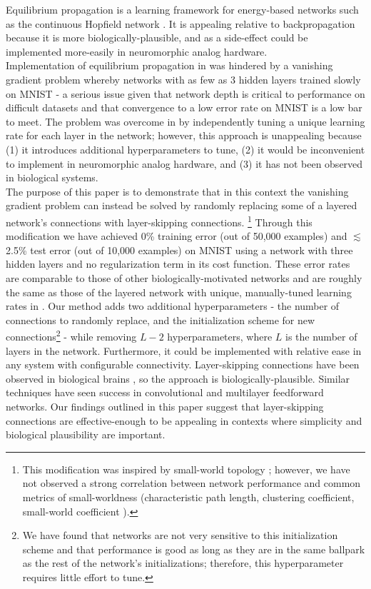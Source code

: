 \documentclass[format=sigconf]{acmart}
\newcommand{\npar}{\\\indent}
\begin{document}
Equilibrium propagation \cite{scellier17} is a learning framework for energy-based networks such as the continuous Hopfield network \cite{hopfield1984}. It is appealing relative to backpropagation because it is more biologically-plausible, and as a side-effect could be implemented more-easily in neuromorphic analog hardware.
\npar
Implementation of equilibrium propagation in \cite{scellier17} was hindered by a vanishing gradient problem whereby networks with as few as 3 hidden layers trained slowly on MNIST \cite{mnist1998} - a serious issue given that network depth is critical to performance on difficult datasets \cite{simonyan2014, srivastava2015tvdn} and that convergence to a low error rate on MNIST is a low bar to meet. The problem was overcome in \cite{scellier17} by independently tuning a unique learning rate for each layer in the network; however, this approach is unappealing because (1) it introduces additional hyperparameters to tune, (2) it would be inconvenient to implement in neuromorphic analog hardware, and (3) it has not been observed in biological systems.
\npar
The purpose of this paper is to demonstrate that in this context the vanishing gradient problem can instead be solved by randomly replacing some of a layered network's connections with layer-skipping connections.
\footnote{This modification was inspired by small-world topology \cite{watts98}; however, we have not observed a strong correlation between network performance and common metrics of small-worldness (characteristic path length, clustering coefficient, small-world coefficient \cite{humphries2008}).}
Through this modification we have achieved 0\% training error (out of 50,000 examples) and $\lesssim$2.5\% test error (out of 10,000 examples) on MNIST using a network with three hidden layers and no regularization term in its cost function. These error rates are comparable to those of other biologically-motivated networks \cite{bartunov2018} and are roughly the same as those of the layered network with unique, manually-tuned learning rates in \cite{scellier17}. Our method adds two additional hyperparameters - the number of connections to randomly replace, and the initialization scheme for new connections\footnote{We have found that networks are not very sensitive to this initialization scheme and that performance is good as long as they are in the same ballpark as the rest of the network's initializations; therefore, this hyperparameter requires little effort to tune.} - while removing $L-2$ hyperparameters, where $L$ is the number of layers in the network. Furthermore, it could be implemented with relative ease in any system with configurable connectivity. Layer-skipping connections have been observed in biological brains \cite{bullmore2009}, so the approach is biologically-plausible. Similar techniques have seen success in convolutional \cite{he2015, srivastava2015} and multilayer feedforward \cite{xiaohu2011, krishnan2019} networks. Our findings outlined in this paper suggest that layer-skipping connections are effective-enough to be appealing in contexts where simplicity and biological plausibility are important.
\end{document}
